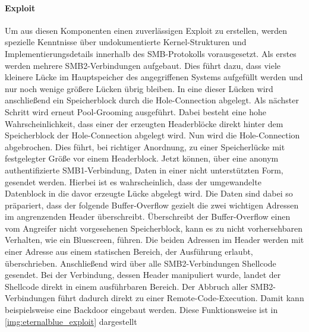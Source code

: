 \documentclass{AIFB_ITI_Crypto_Seminar}
\begin{document}
\paragraph{Exploit}
Um aus diesen Komponenten einen zuverlässigen Exploit zu erstellen, werden spezielle Kenntnisse über undokumentierte Kernel-Strukturen und Implementierungsdetails innerhalb des SMB-Protokolls vorausgesetzt. Als erstes werden mehrere SMB2-Verbindungen aufgebaut. Dies führt dazu, dass viele kleinere Lücke im Hauptspeicher des angegriffenen Systems aufgefüllt werden und nur noch wenige größere Lücken übrig bleiben. In eine dieser Lücken wird anschließend ein Speicherblock durch die Hole-Connection abgelegt. Als nächster Schritt wird erneut Pool-Grooming ausgeführt. Dabei besteht eine hohe Wahrscheinlichkeit, dass einer der erzeugten Headerblöcke direkt hinter dem Speicherblock der Hole-Connection abgelegt wird. Nun wird die Hole-Connection abgebrochen. Dies führt, bei richtiger Anordnung, zu einer Speicherlücke mit festgelegter Größe vor einem Headerblock. Jetzt können, über eine anonym authentifizierte SMB1-Verbindung, Daten in einer nicht unterstützten Form, gesendet werden. Hierbei ist es wahrscheinlich, dass der umgewandelte Datenblock in die davor erzeugte Lücke abgelegt wird. Die Daten sind dabei so präpariert, dass der folgende Buffer-Overflow gezielt die zwei wichtigen Adressen im angrenzenden Header überschreibt. Überschreibt der Buffer-Overflow einen vom Angreifer nicht vorgesehenen Speicherblock, kann es zu nicht vorhersehbaren Verhalten, wie ein Bluescreen, führen. Die beiden Adressen im Header werden mit einer Adresse aus einem statischen Bereich, der Ausführung erlaubt, überschrieben. Anschließend wird über alle SMB2-Verbindungen Shellcode gesendet. Bei der Verbindung, dessen Header manipuliert wurde, landet der Shellcode direkt in einem ausführbaren Bereich. Der Abbruch aller SMB2-Verbindungen führt dadurch direkt zu einer Remote-Code-Execution. Damit kann beispielsweise eine Backdoor eingebaut werden. Diese Funktionsweise ist in \autoref{img:eternalblue_exploit} dargestellt

\clearpage
\end{document}
